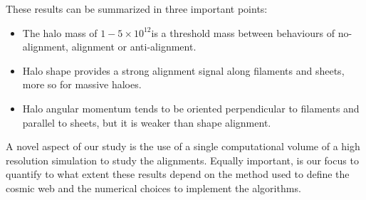 \documentclass[useAMS,usenatbib]{mn2e}
\newcommand{\hMsun}{{\ifmmode{h^{-1}{\rm
        {M_{\odot}}}}\else{$h^{-1}{\rm{M_{\odot}}}$~}\fi}}
\begin{document}
These results can be summarized in three important points:
\begin{itemize}
\item The halo mass of $1-5\times 10^{12}$\hMsun is a threshold mass between
behaviours of no-alignment, alignment or anti-alignment.
\item Halo shape provides a strong alignment signal along filaments
  and sheets, more so for massive haloes.
\item Halo angular momentum tends to be oriented perpendicular to filaments and
parallel to sheets, but it is weaker than shape alignment.
\end{itemize}

A novel aspect of our study is the use of a single computational
volume of a high resolution simulation to study the
alignments. Equally important, is our focus to quantify to what extent
these results depend on the method used to define the cosmic web and
the numerical choices to implement the algorithms.  
\end{document}
